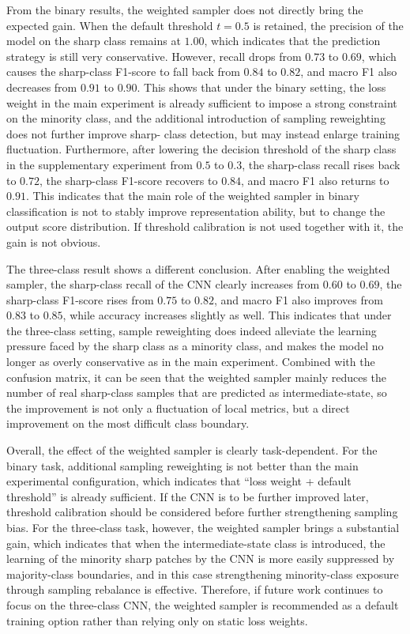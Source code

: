 \par From the binary results, the weighted sampler does not directly bring the
expected gain. When the default threshold $t=0.5$ is retained, the precision
of the model on the sharp class remains at $1.00$, which indicates that the
prediction strategy is still very conservative. However, recall drops from
$0.73$ to $0.69$, which causes the sharp-class F1-score to fall back from
$0.84$ to $0.82$, and macro F1 also decreases from $0.91$ to $0.90$. This
shows that under the binary setting, the loss weight in the main experiment is
already sufficient to impose a strong constraint on the minority class, and the
additional introduction of sampling reweighting does not further improve sharp-
class detection, but may instead enlarge training fluctuation. Furthermore,
after lowering the decision threshold of the sharp class in the supplementary
experiment from $0.5$ to $0.3$, the sharp-class recall rises back to $0.72$,
the sharp-class F1-score recovers to $0.84$, and macro F1 also returns to
$0.91$. This indicates that the main role of the weighted sampler in binary
classification is not to stably improve representation ability, but to change
the output score distribution. If threshold calibration is not used together
with it, the gain is not obvious.

\par The three-class result shows a different conclusion. After enabling the
weighted sampler, the sharp-class recall of the CNN clearly increases from
$0.60$ to $0.69$, the sharp-class F1-score rises from $0.75$ to $0.82$, and
macro F1 also improves from $0.83$ to $0.85$, while accuracy increases
slightly as well. This indicates that under the three-class setting, sample
reweighting does indeed alleviate the learning pressure faced by the sharp
class as a minority class, and makes the model no longer as overly
conservative as in the main experiment. Combined with the confusion matrix, it
can be seen that the weighted sampler mainly reduces the number of real
sharp-class samples that are predicted as intermediate-state, so the
improvement is not only a fluctuation of local metrics, but a direct
improvement on the most difficult class boundary.

\par Overall, the effect of the weighted sampler is clearly task-dependent. For
the binary task, additional sampling reweighting is not better than the main
experimental configuration, which indicates that ``loss weight + default
threshold'' is already sufficient. If the CNN is to be further improved later,
threshold calibration should be considered before further strengthening
sampling bias. For the three-class task, however, the weighted sampler brings a
substantial gain, which indicates that when the intermediate-state class is
introduced, the learning of the minority sharp patches by the CNN is more
easily suppressed by majority-class boundaries, and in this case strengthening
minority-class exposure through sampling rebalance is effective. Therefore, if
future work continues to focus on the three-class CNN, the weighted sampler is
recommended as a default training option rather than relying only on static
loss weights.


